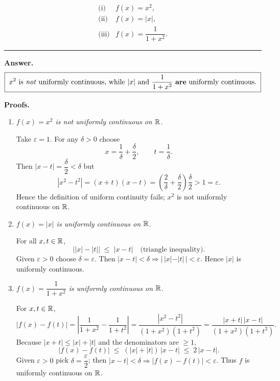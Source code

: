 \documentclass[12pt]{article}
\theoremstyle{definition} %
\theoremstyle{plain} %
\begin{document}
\[
\begin{array}{lll}
\text{(i)} & f(x)=x^{2}, \\[4pt]
\text{(ii)}& f(x)=|x|,   \\[4pt]
\text{(iii)}& f(x)=\dfrac{1}{1+x^{2}} .
\end{array}
\]

\bigskip
\hrule
\bigskip

\textbf{Answer.}
\[
   \boxed{\;
      \text{\(x^{2}\) is \emph{not} uniformly continuous, while
      \(|x|\) and \(\dfrac1{1+x^{2}}\) \textbf{are} uniformly
      continuous.}
   \;}
\]

\bigskip
\textbf{Proofs.}

\begin{enumerate}[label=\textbf{(\roman*)}]

\item \emph{\(f(x)=x^{2}\) is not uniformly continuous on \(\Bbb R\).}

   Take \(\varepsilon=1\).
   For any \(\delta>0\) choose
   \[
      x = \frac1\delta+\frac{\delta}{2}, \qquad
      t = \frac1\delta .
   \]
   Then \(|x-t|=\dfrac{\delta}{2}<\delta\) but
   \[
      |x^{2}-t^{2}| = (x+t)(x-t)
                    =\left(\frac{2}{\delta}+\frac{\delta}{2}\right)
                     \frac{\delta}{2}
                    > 1=\varepsilon .
   \]
   Hence the definition of uniform continuity fails; \(x^{2}\) is not
   uniformly continuous on \(\Bbb R\).

\item \emph{\(f(x)=|x|\) is uniformly continuous on \(\Bbb R\).}

   For all \(x,t\in\Bbb R\),
   \[
      \bigl||x|-|t|\bigr|\;\le\;|x-t| \quad\text{(triangle inequality).}
   \]
   Given \(\varepsilon>0\) choose \(\delta=\varepsilon\).
   Then \(|x-t|<\delta\Rightarrow |\,|x|-|t|\,|<\varepsilon\).
   Hence \(|x|\) is uniformly continuous.

\item \emph{\(\displaystyle f(x)=\dfrac{1}{1+x^{2}}\) is uniformly
        continuous on \(\Bbb R\).}

   For \(x,t\in\Bbb R\),
   \[
      |f(x)-f(t)|
        =\left|\frac{1}{1+x^{2}}-\frac{1}{1+t^{2}}\right|
        =\frac{|x^{2}-t^{2}|}{(1+x^{2})(1+t^{2})}
        =\frac{|x+t|\,|x-t|}{(1+x^{2})(1+t^{2})}.
   \]
   Because \(|x+t|\le |x|+|t|\) and the denominators are \(\ge1\),
   \[
      |f(x)-f(t)| \;\le\; (|x|+|t|)\,|x-t|
                    \;\le\; 2\,|x-t|.
   \]
   Given \(\varepsilon>0\) pick \(\delta=\dfrac{\varepsilon}{2}\);
   then \(|x-t|<\delta\Rightarrow |f(x)-f(t)|<\varepsilon\).
   Thus \(f\) is uniformly continuous on \(\Bbb R\).

\end{enumerate}
\end{document}
